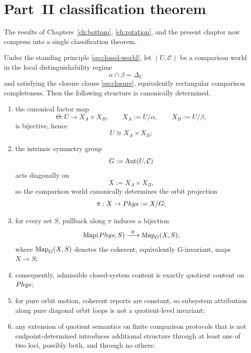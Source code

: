 \section{Part~II classification theorem}
\label{sec:partII-classification}
The results of Chapters~\ref{ch:bottom}, \ref{ch:rotation}, and the
present chapter now compress into a single classification theorem.
\begin{theorem}
	\label{thm:structural-closure}
	Under the standing principle \cref{sp:closed-world}, let
	\((U,\mathcal C)\) be a comparison world in the local
	distinguishability regime
	\[
		\alpha\cap\beta=\Delta_U
	\]
	and satisfying the closure clause \cref{sp:closure}, equivalently
	rectangular comparison completeness.
	Then the following structure is canonically determined.
	\begin{enumerate}[label=\textup{(\roman*)}]
		\item
		      the canonical factor map
		      \[
			      \Theta:U\to X_A\times X_B,
			      \qquad
			      X_A:=U/\alpha,
			      \qquad
			      X_B:=U/\beta,
		      \]
		      is bijective, hence
		      \[
			      U\cong X_A\times X_B;
		      \]
		\item
		      the intrinsic symmetry group
		      \[
			      G:=\operatorname{Aut}(U,\mathcal C)
		      \]
		      acts diagonally on
		      \[
			      X:=X_A\times X_B,
		      \]
		      so the comparison world canonically determines the orbit projection
		      \[
			      \pi:X\to Phys:=X/G;
		      \]
		\item
		      for every set \(S\), pullback along \(\pi\) induces a bijection
		      \[
			      \Map(\Phys,S)\xrightarrow{\ \cong\ }\Map_G(X,S),
		      \]
		      where \(\operatorname{Map}_G(X,S)\) denotes the coherent, equivalently \(G\)-invariant,
		      maps \(X\to S\);
		\item
		      consequently, admissible closed-system content is exactly quotient
		      content on \(Phys\);
		\item
		      for pure orbit motion, coherent reports are constant, so subsystem
		      attribution along pure diagonal orbit loops is not a quotient-level
		      invariant;
		\item
		      any extension of quotient semantics on finite comparison protocols that
		      is not endpoint-determined introduces additional structure through at
		      least one of two loci, possibly both, and through no others:
		      \begin{enumerate}[label=\textup{(\alph*)}]

\end{enumerate}
\end{enumerate}
\end{theorem}
